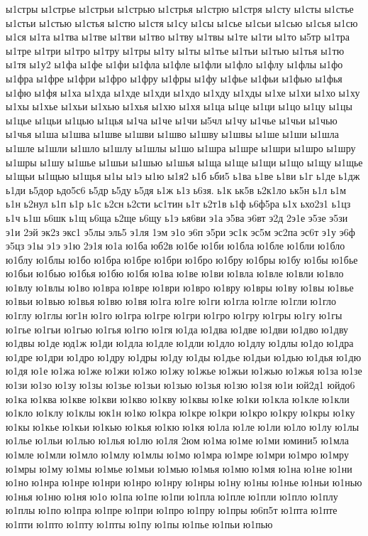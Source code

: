 {ы1стры
ы1стрье
ы1стрьи
ы1стрью
ы1стрья
ы1стрю
ы1стря
ы1сту
ы1сты
ы1стье
ы1стьи
ы1стью
ы1стья
ы1стю
ы1стя
ы1су
ы1сы
ы1сье
ы1сьи
ы1сью
ы1сья
ы1сю
ы1ся
ы1та
ы1тва
ы1тве
ы1тви
ы1тво
ы1тву
ы1твы
ы1те
ы1ти
ы1то
ы5тр
ы1тра
ы1тре
ы1три
ы1тро
ы1тру
ы1тры
ы1ту
ы1ты
ы1тье
ы1тьи
ы1тью
ы1тья
ы1тю
ы1тя
ы1у2
ы1фа
ы1фе
ы1фи
ы1фла
ы1фле
ы1фли
ы1фло
ы1флу
ы1флы
ы1фо
ы1фра
ы1фре
ы1фри
ы1фро
ы1фру
ы1фры
ы1фу
ы1фье
ы1фьи
ы1фью
ы1фья
ы1фю
ы1фя
ы1ха
ы1хда
ы1хде
ы1хди
ы1хдо
ы1хду
ы1хды
ы1хе
ы1хи
ы1хо
ы1ху
ы1хы
ы1хье
ы1хьи
ы1хью
ы1хья
ы1хю
ы1хя
ы1ца
ы1це
ы1ци
ы1цо
ы1цу
ы1цы
ы1цье
ы1цьи
ы1цью
ы1цья
ы1ча
ы1че
ы1чи
ы5чл
ы1чу
ы1чье
ы1чьи
ы1чью
ы1чья
ы1ша
ы1шва
ы1шве
ы1шви
ы1шво
ы1шву
ы1швы
ы1ше
ы1ши
ы1шла
ы1шле
ы1шли
ы1шло
ы1шлу
ы1шлы
ы1шо
ы1шра
ы1шре
ы1шри
ы1шро
ы1шру
ы1шры
ы1шу
ы1шье
ы1шьи
ы1шью
ы1шья
ы1ща
ы1ще
ы1щи
ы1що
ы1щу
ы1щье
ы1щьи
ы1щью
ы1щья
ы1ы
ы1э
ы1ю
ы1я2
ь1б
ьби5
ь1ва
ь1ве
ь1ви
ь1г
ь1де
ь1дж
ь1ди
ь5дор
ьдо5с6
ь5др
ь5ду
ь5дя
ь1ж
ь1з
ь6зя.
ь1к
ьк5в
ь2к1ло
ьк5н
ь1л
ь1м
ь1н
ь2нул
ь1п
ь1р
ь1с
ь2сн
ь2сти
ьс1тин
ь1т
ь2т1в
ь1ф
ь6ф5ра
ь1х
ьхо2з1
ь1цз
ь1ч
ь1ш
ь6шк
ь1щ
ь6ща
ь2ще
ь6щу
ь1э
ья6ви
э1а
э5ва
э6вт
э2д
2э1е
э5зе
э5зи
э1и
2эй
эк2з
экс1
э5лы
эль5
э1ля
1эм
э1о
э6п
э5ри
эс1к
эс5м
эс2па
эс6т
э1у
э6ф
э5цз
э1ы
э1э
э1ю
2э1я
ю1а
ю1ба
юб2в
ю1бе
ю1би
ю1бла
ю1бле
ю1бли
ю1бло
ю1блу
ю1блы
ю1бо
ю1бра
ю1бре
ю1бри
ю1бро
ю1бру
ю1бры
ю1бу
ю1бы
ю1бье
ю1бьи
ю1бью
ю1бья
ю1бю
ю1бя
ю1ва
ю1ве
ю1ви
ю1вла
ю1вле
ю1вли
ю1вло
ю1влу
ю1влы
ю1во
ю1вра
ю1вре
ю1ври
ю1вро
ю1вру
ю1вры
ю1ву
ю1вы
ю1вье
ю1вьи
ю1вью
ю1вья
ю1вю
ю1вя
ю1га
ю1ге
ю1ги
ю1гла
ю1гле
ю1гли
ю1гло
ю1глу
ю1глы
юг1н
ю1го
ю1гра
ю1гре
ю1гри
ю1гро
ю1гру
ю1гры
ю1гу
ю1гы
ю1гье
ю1гьи
ю1гью
ю1гья
ю1гю
ю1гя
ю1да
ю1два
ю1две
ю1дви
ю1дво
ю1дву
ю1двы
ю1де
юд1ж
ю1ди
ю1дла
ю1дле
ю1дли
ю1дло
ю1длу
ю1длы
ю1до
ю1дра
ю1дре
ю1дри
ю1дро
ю1дру
ю1дры
ю1ду
ю1ды
ю1дье
ю1дьи
ю1дью
ю1дья
ю1дю
ю1дя
ю1е
ю1жа
ю1же
ю1жи
ю1жо
ю1жу
ю1жье
ю1жьи
ю1жью
ю1жья
ю1за
ю1зе
ю1зи
ю1зо
ю1зу
ю1зы
ю1зье
ю1зьи
ю1зью
ю1зья
ю1зю
ю1зя
ю1и
юй2д1
юйдо6
ю1ка
ю1ква
ю1кве
ю1кви
ю1кво
ю1кву
ю1квы
ю1ке
ю1ки
ю1кла
ю1кле
ю1кли
ю1кло
ю1клу
ю1клы
юк1н
ю1ко
ю1кра
ю1кре
ю1кри
ю1кро
ю1кру
ю1кры
ю1ку
ю1кы
ю1кье
ю1кьи
ю1кью
ю1кья
ю1кю
ю1кя
ю1ла
ю1ле
ю1ли
ю1ло
ю1лу
ю1лы
ю1лье
ю1льи
ю1лью
ю1лья
ю1лю
ю1ля
2юм
ю1ма
ю1ме
ю1ми
юмини5
ю1мла
ю1мле
ю1мли
ю1мло
ю1млу
ю1млы
ю1мо
ю1мра
ю1мре
ю1мри
ю1мро
ю1мру
ю1мры
ю1му
ю1мы
ю1мье
ю1мьи
ю1мью
ю1мья
ю1мю
ю1мя
ю1на
ю1не
ю1ни
ю1но
ю1нра
ю1нре
ю1нри
ю1нро
ю1нру
ю1нры
ю1ну
ю1ны
ю1нье
ю1ньи
ю1нью
ю1нья
ю1ню
ю1ня
ю1о
ю1па
ю1пе
ю1пи
ю1пла
ю1пле
ю1пли
ю1пло
ю1плу
ю1плы
ю1по
ю1пра
ю1пре
ю1при
ю1про
ю1пру
ю1пры
ю6п5т
ю1пта
ю1пте
ю1пти
ю1пто
ю1пту
ю1пты
ю1пу
ю1пы
ю1пье
ю1пьи
ю1пью
}
